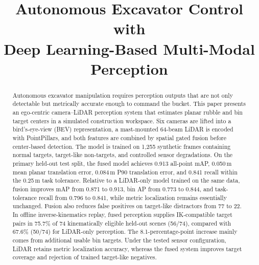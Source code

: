 \documentclass[conference]{IEEEtran}
\begin{document}
\title{Autonomous Excavator Control with\\
Deep Learning-Based Multi-Modal Perception}

\author{
}

\maketitle

\begin{abstract}
Autonomous excavator manipulation requires perception outputs that are not only detectable but metrically accurate enough to command the bucket. This paper presents an ego-centric camera--LiDAR perception system that estimates planar rubble and bin target centers in a simulated construction workspace. Six cameras are lifted into a bird's-eye-view (BEV) representation, a mast-mounted 64-beam LiDAR is encoded with PointPillars, and both features are combined by spatial gated fusion before center-based detection. The model is trained on 1,255 synthetic frames containing normal targets, target-like non-targets, and controlled sensor degradations. On the primary held-out test split, the fused model achieves 0.913 all-point mAP, 0.050\,m mean planar translation error, 0.084\,m P90 translation error, and 0.841 recall within the 0.25\,m task tolerance. Relative to a LiDAR-only model trained on the same data, fusion improves mAP from 0.871 to 0.913, bin AP from 0.773 to 0.844, and task-tolerance recall from 0.796 to 0.841, while metric localization remains essentially unchanged. Fusion also reduces false positives on target-like distractors from 77 to 22. In offline inverse-kinematics replay, fused perception supplies IK-compatible target pairs in 75.7\% of 74 kinematically eligible held-out scenes (56/74), compared with 67.6\% (50/74) for LiDAR-only perception. The 8.1-percentage-point increase mainly comes from additional usable bin targets. Under the tested sensor configuration, LiDAR retains metric localization accuracy, whereas the fused system improves target coverage and rejection of trained target-like negatives.
\end{abstract}
\end{document}
